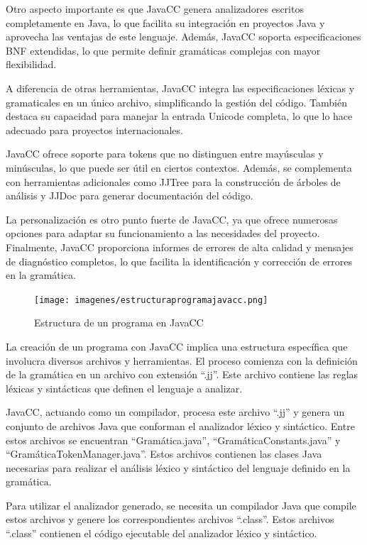 Otro aspecto importante es que JavaCC genera analizadores escritos completamente en Java, lo que facilita su integración en proyectos Java y aprovecha las ventajas de este lenguaje. Además, JavaCC soporta especificaciones BNF extendidas, lo que permite definir gramáticas complejas con mayor flexibilidad.

A diferencia de otras herramientas, JavaCC integra las especificaciones léxicas y gramaticales en un único archivo, simplificando la gestión del código. También destaca su capacidad para manejar la entrada Unicode completa, lo que lo hace adecuado para proyectos internacionales.

JavaCC ofrece soporte para tokens que no distinguen entre mayúsculas y minúsculas, lo que puede ser útil en ciertos contextos. Además, se complementa con herramientas adicionales como JJTree para la construcción de árboles de análisis y JJDoc para generar documentación del código.

La personalización es otro punto fuerte de JavaCC, ya que ofrece numerosas opciones para adaptar su funcionamiento a las necesidades del proyecto. Finalmente, JavaCC proporciona informes de errores de alta calidad y mensajes de diagnóstico completos, lo que facilita la identificación y corrección de errores en la gramática.

\begin{figure}[H]
	\centering
	\texttt{[image: imagenes/estructuraprogramajavacc.png]}
	\caption{\label{fig:estructuraprogramajavacc}Estructura de un programa en JavaCC \cite{estructuraprogramajavacc}}
\end{figure}

La creación de un programa con JavaCC implica una estructura específica que involucra diversos archivos y herramientas. El proceso comienza con la definición de la gramática en un archivo con extensión ``.jj''. Este archivo contiene las reglas léxicas y sintácticas que definen el lenguaje a analizar.

JavaCC, actuando como un compilador, procesa este archivo ``.jj'' y genera un conjunto de archivos Java que conforman el analizador léxico y sintáctico. Entre estos archivos se encuentran ``Gramática.java'', ``GramáticaConstants.java'' y ``GramáticaTokenManager.java''. Estos archivos contienen las clases Java necesarias para realizar el análisis léxico y sintáctico del lenguaje definido en la gramática.

Para utilizar el analizador generado, se necesita un compilador Java que compile estos archivos y genere los correspondientes archivos ``.class''. Estos archivos ``.class'' contienen el código ejecutable del analizador léxico y sintáctico.

